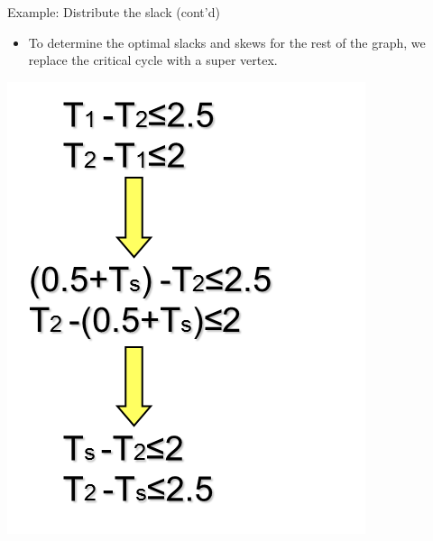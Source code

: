 \documentclass[
  ignorenonframetext,
]{beamer}
\providecommand{\tightlist}{%
  \setlength{\itemsep}{0pt}\setlength{\parskip}{0pt}}
\begin{document}
\begin{frame}{Example: Distribute the slack (cont'd)}
\protect\hypertarget{example-distribute-the-slack-contd}{}
\begin{itemize}
\tightlist
\item
  To determine the optimal slacks and skews for the rest of the graph,
  we replace the critical cycle with a super vertex.
\end{itemize}

\columnsbegin
{}

\pause
{}

\pause
{}

\includegraphics{lec05.files/fig13.png}\\
\columnsend
\end{frame}
\end{document}
